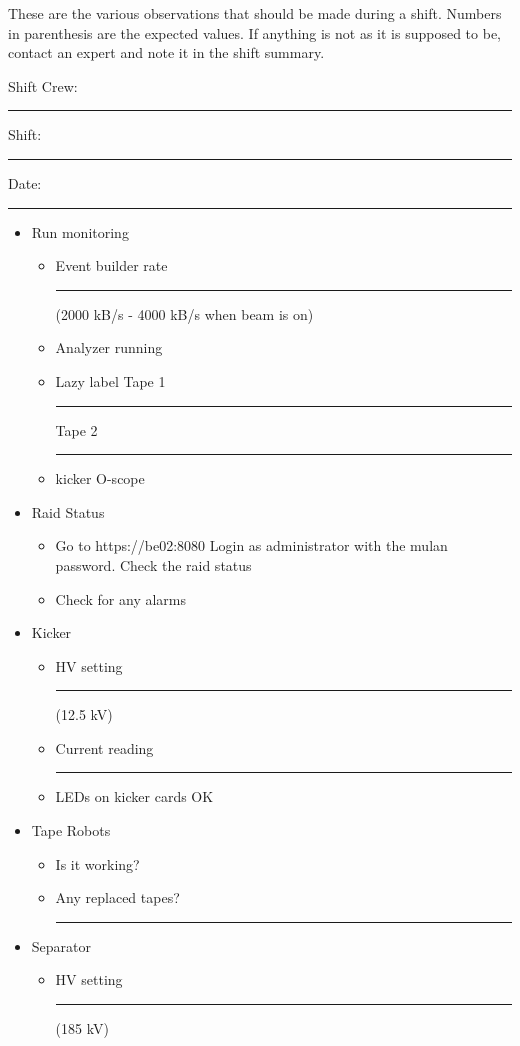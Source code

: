 \documentclass[10pt]{article}
\begin{document}
These are the various observations that should be made during a shift.
Numbers in parenthesis are the expected values.  If anything is not
as it is supposed to be, contact an expert and note it in the
shift summary.\newline


\noindent Shift Crew:\rule[-1pt]{240pt}{1pt} \newline
Shift: \rule[-1pt]{60pt}{1pt} \newline
Date:\rule[-1pt]{60pt}{1pt} \newline


  \begin{itemize}
  \item Run monitoring
    \begin{itemize}
    \item Event builder rate \rule[-1pt]{40pt}{1pt} (2000 kB/s - 4000 kB/s when beam is on)
    \item Analyzer running
    \item Lazy label Tape 1 \rule[-1pt]{40pt}{1pt} Tape 2 \rule[-1pt]{40pt}{1pt}
    \item kicker O-scope
    \end{itemize}
  \item Raid Status
    \begin{itemize}
    \item Go to https://be02:8080 
      Login as administrator with the mulan password.
      Check the raid status
    \item Check for any alarms
    \end{itemize}
  \item Kicker
    \begin{itemize}
    \item HV setting \rule[-1pt]{40pt}{1pt} (12.5 kV)
    \item Current reading \rule[-1pt]{40pt}{1pt} 
    \item LEDs on kicker cards OK
    \end{itemize}
  \item{Tape Robots}
    \begin{itemize}
    \item Is it working?
    \item Any replaced tapes?  \rule[-1pt]{40pt}{1pt}
    \end{itemize}
  \item Separator 
    \begin{itemize}
    \item HV setting \rule[-1pt]{40pt}{1pt} (185 kV)

\end{itemize}
\end{itemize}
\end{document}
